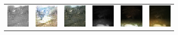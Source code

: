 \begin{figure}[htp!]
\begin{subfigure}{\textwidth}
\begin{tabularx}{\textwidth}{Y Y Y !{\space} Y Y Y}
            \includegraphics{gfx/conditional-diffusion-sampling-caltech-qual/nir_585c042f-23d2-11e8-a6a3-ec086b02610b.jpg} & \includegraphics{gfx/conditional-diffusion-sampling-caltech-qual/cyclegan_585c042f-23d2-11e8-a6a3-ec086b02610b_fake.png} & \includegraphics{gfx/conditional-diffusion-sampling-caltech-qual/diffusion_585c042f-23d2-11e8-a6a3-ec086b02610b.png} & \includegraphics{gfx/conditional-diffusion-sampling-qual/nir_S2_B06_R1_PICT0387.jpg} & \includegraphics{gfx/conditional-diffusion-sampling-qual/cyclegan_S2_B06_R1_PICT0387_fake.png} & \includegraphics{gfx/conditional-diffusion-sampling-qual/diffusion_S2_B06_R1_PICT0387.png} \\

\end{tabularx}
\end{subfigure}
\end{figure}

